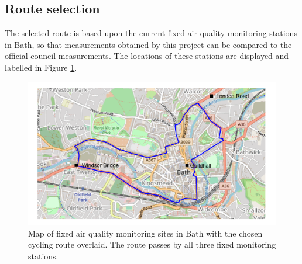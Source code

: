 \documentclass[11pt]{report}
\begin{document}
\subsection{Route selection} \label{route_selection}

The selected route is based upon the current fixed air quality monitoring stations in Bath, so that measurements obtained by this project can be compared to the official council measurements. The locations of these stations are displayed and labelled in Figure \ref{cycling_route}.



\begin{figure}[!tb]
  \centering
  \includegraphics[width=0.7\linewidth]{cycling_route}
  \caption{Map of fixed air quality monitoring sites in Bath with the chosen cycling route overlaid. The route passes by all three fixed monitoring stations.}
  \label{cycling_route}
\end{figure}

\end{document}
